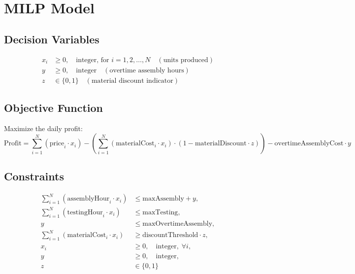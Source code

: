 \documentclass{article}
\begin{document}
\section*{MILP Model}

\subsection*{Decision Variables}
\begin{align*}
x_i &\geq 0, \quad \text{integer, for } i = 1, 2, \ldots, N \quad (\text{units produced}) \\
y &\geq 0, \quad \text{integer} \quad (\text{overtime assembly hours}) \\
z &\in \{0, 1\} \quad (\text{material discount indicator})
\end{align*}

\subsection*{Objective Function}
Maximize the daily profit:
\[
\text{Profit} = \sum_{i=1}^{N} (\text{price}_i \cdot x_i) - \left( \sum_{i=1}^{N} (\text{materialCost}_i \cdot x_i) \cdot (1 - \text{materialDiscount} \cdot z) \right) - \text{overtimeAssemblyCost} \cdot y
\]

\subsection*{Constraints}
\begin{align}
\sum_{i=1}^{N} (\text{assemblyHour}_i \cdot x_i) &\leq \text{maxAssembly} + y, \\
\sum_{i=1}^{N} (\text{testingHour}_i \cdot x_i) &\leq \text{maxTesting}, \\
y &\leq \text{maxOvertimeAssembly}, \\
\sum_{i=1}^{N} (\text{materialCost}_i \cdot x_i) &\geq \text{discountThreshold} \cdot z, \\
x_i &\geq 0, \quad \text{integer},\; \forall i, \\
y &\geq 0, \quad \text{integer}, \\
z &\in \{0, 1\}
\end{align}
\end{document}
